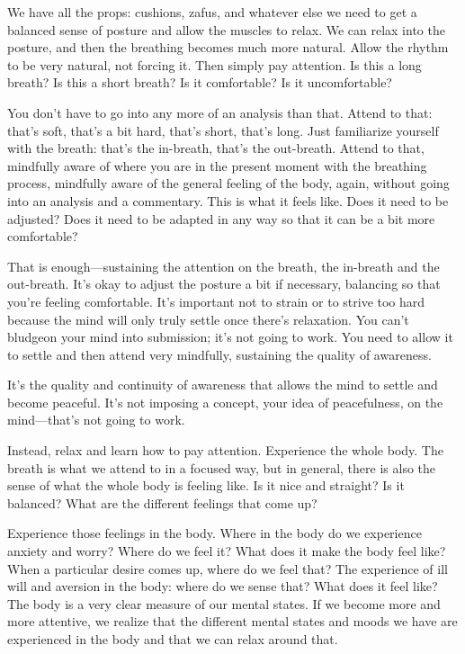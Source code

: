 We have all the props: cushions, zafus, and whatever else we need to get
a balanced sense of posture and allow the muscles to relax. We can relax
into the posture, and then the breathing becomes much more natural.
Allow the rhythm to be very natural, not forcing it. Then simply pay
attention. Is this a long breath? Is this a short breath? Is it
comfortable? Is it uncomfortable?

You don’t have to go into any more of an analysis than that. Attend to
that: that’s soft, that’s a bit hard, that’s short, that’s long. Just
familiarize yourself with the breath: that’s the in-breath, that’s the
out-breath. Attend to that, mindfully aware of where you are in the
present moment with the breathing process, mindfully aware of the
general feeling of the body, again, without going into an analysis and a
commentary. This is what it feels like. Does it need to be adjusted?
Does it need to be adapted in any way so that it can be a bit more
comfortable?

That is enough—sustaining the attention on the breath, the in-breath and
the out-breath. It’s okay to adjust the posture a bit if necessary,
balancing so that you’re feeling comfortable. It’s important not to
strain or to strive too hard because the mind will only truly settle
once there’s relaxation. You can’t bludgeon your mind into submission;
it’s not going to work. You need to allow it to settle and then attend
very mindfully, sustaining the quality of awareness.

It’s the quality and continuity of awareness that allows the mind to
settle and become peaceful. It’s not imposing a concept, your idea of
peacefulness, on the mind—that’s not going to work.

Instead, relax and learn how to pay attention. Experience the whole
body. The breath is what we attend to in a focused way, but in general,
there is also the sense of what the whole body is feeling like. Is it
nice and straight? Is it balanced? What are the different feelings that
come up?

Experience those feelings in the body. Where in the body do we
experience anxiety and worry? Where do we feel it? What does it make the
body feel like? When a particular desire comes up, where do we feel
that? The experience of ill will and aversion in the body: where do we
sense that? What does it feel like? The body is a very clear measure of
our mental states. If we become more and more attentive, we realize that
the different mental states and moods we have are experienced in the
body and that we can relax around that.

